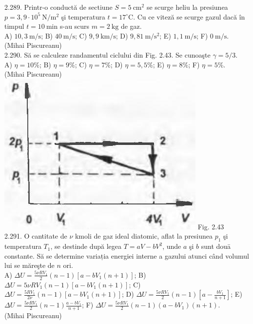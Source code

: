 \documentclass[10pt]{article}
\begin{document}
2.289. Printr-o conductă de sectiune $S=5 \mathrm{~cm}^{2}$ se scurge heliu la presiunea $p=3,9 \cdot 10^{5} \mathrm{~N} / \mathrm{m}^{2}$ şi temperatura $t=17^{\circ} \mathrm{C}$. Cu ce viteză se scurge gazul dacă în timpul $t=10 \mathrm{~min}$ s-au scurs $m=2 \mathrm{~kg}$ de gaz.\\ A) $10,3 \mathrm{~m} / \mathrm{s}$; B) $40 \mathrm{~m} / \mathrm{s}$; C) $9,9 \mathrm{~km} / \mathrm{s}$; D) $9,81 \mathrm{~m} / \mathrm{s}^{2}$; E) $1,1 \mathrm{~m} / \mathrm{s}$; F) $0 \mathrm{~m} / \mathrm{s}$.\\ (Mihai Piscureanu)\\

2.290. Să se calculeze randamentul ciclului din Fig. 2.43. Se cunoaşte $\gamma=5 / 3$.\\ A) $\eta=10 \%$; B) $\eta=9 \%$; C) $\eta=7 \%$; D) $\eta=5,5 \%$; E) $\eta=8 \%$; F) $\eta=5 \%$.\\ (Mihai Piscureanu)\\ \includegraphics[max width=\textwidth, center]{2025_07_01_5b3ff9fa0d508c8e9f17g-138} Fig. 2.43\\

2.291. O cantitate de $\nu$ kmoli de gaz ideal diatomic, aflat la presiunea $p_{1}$ şi temperatura $T_{1}$, se destinde după legea $T=a V-b V^{2}$, unde $a$ şi $b$ sunt douā constante. Să se determine variația energiei interne a gazului atunci când volumul lui se măreşte de $n$ ori.\\ A) $\Delta U=\frac{5 \nu R V_{1}}{2}(n-1)\left[a-b V_{1}(n+1)\right]$; B) $\Delta U=5 \nu R V_{1}(n-1)\left[a-b V_{1}(n+1)\right]$; C) $\Delta U=\frac{5 R V_{1}}{2 \nu}(n-1)\left[a-b V_{1}(n+1)\right]$; D) $\Delta U=\frac{5 \nu R V_{1}}{2}(n-1)\left[a-\frac{b V_{1}}{n+1}\right]$; E) $\Delta U=\frac{5 \nu R V_{1}}{2}(n-1) \frac{a-b V_{1}}{n+1}$; F) $\Delta U=\frac{5 \nu R V_{1}}{2}(n-1)\left(a-b V_{1}\right)(n+1)$.\\ (Mihai Piscureanu)\\
\end{document}
